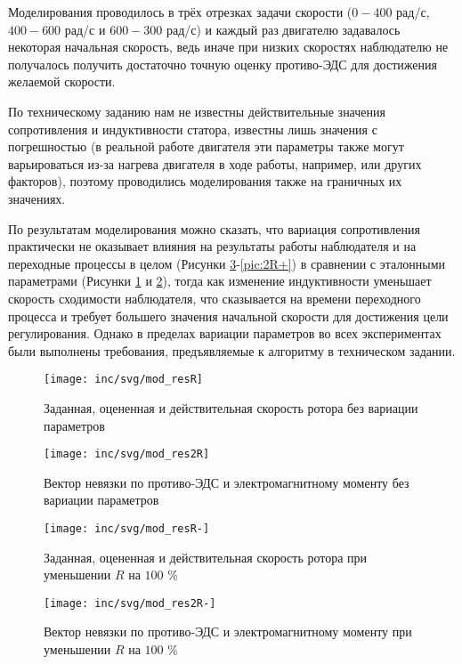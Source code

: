 Моделирования проводилось в трёх отрезках задачи скорости ($0-400$ рад/с, $400-600$ рад/с и $600-300$ рад/с) и каждый раз двигателю задавалось некоторая начальная скорость, ведь иначе при низких скоростях наблюдателю не получалось получить достаточно точную оценку противо-ЭДС для достижения желаемой скорости.

По техническому заданию нам не известны действительные значения сопротивления и индуктивности статора, известны лишь значения с погрешностью (в реальной работе двигателя эти параметры также могут варьироваться из-за нагрева двигателя в ходе работы, например, или других факторов), поэтому проводились моделирования также на граничных их значениях.

По результатам моделирования можно сказать, что вариация сопротивления практически не оказывает влияния на результаты работы наблюдателя и на переходные процессы в целом (Рисунки \ref{pic:R-}-\ref{pic:2R+}) в сравнении с эталонными параметрами (Рисунки \ref{pic:ideal} и \ref{pic:ideal2}), тогда как изменение индуктивности уменьшает скорость сходимости наблюдателя, что сказывается на времени переходного процесса и требует большего значения начальной скорости для достижения цели регулирования. Однако в пределах вариации параметров во всех экспериментах были выполнены требования, предъявляемые к алгоритму в техническом задании.

\begin{figure}[!h]
\centering
\texttt{[image: inc/svg/mod\_resR]}
\caption{Заданная, оцененная и действительная скорость ротора без вариации параметров}
\label{pic:ideal}
\end{figure}

\begin{figure}[!h]
\centering
\texttt{[image: inc/svg/mod\_res2R]}
\caption{Вектор невязки по противо-ЭДС и электромагнитному моменту без вариации параметров}
\label{pic:ideal2}
\end{figure}

\begin{figure}[!h]
\centering
\texttt{[image: inc/svg/mod\_resR-]}
\caption{Заданная, оцененная и действительная скорость ротора при уменьшении $R$ на $100$ \%}
\label{pic:R-}
\end{figure}

\begin{figure}[!h]
\centering
\texttt{[image: inc/svg/mod\_res2R-]}
\caption{Вектор невязки по противо-ЭДС и электромагнитному моменту при уменьшении $R$ на $100$ \%}
\label{pic:2R-}
\end{figure}

